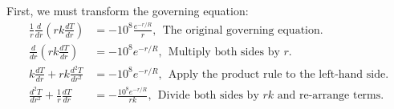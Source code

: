 First, we must transform the governing equation:
\begin{align*}
\frac{1}{r}\frac{d}{dr}\left(rk\frac{dT}{dr}\right) &=-10^8\frac{e^{-r/R}}{r}, \ \ \text{The original governing equation.}\\
\frac{d}{dr}\left(rk\frac{dT}{dr}\right)&=-10^8e^{-r/R}, \ \ \text{Multiply both sides by } r. \\
k\frac{dT}{dr}+rk\frac{d^2T}{dr^2} &= -10^8e^{-r/R}, \ \ \text{Apply the product rule to the left-hand side.}\\
\frac{d^2T}{dr^2}+\frac{1}{r}\frac{dT}{dr} &= -\frac{10^8e^{-r/R}}{rk}, \ \ \text{Divide both sides by }rk\text{ and re-arrange terms.}
\end{align*}


